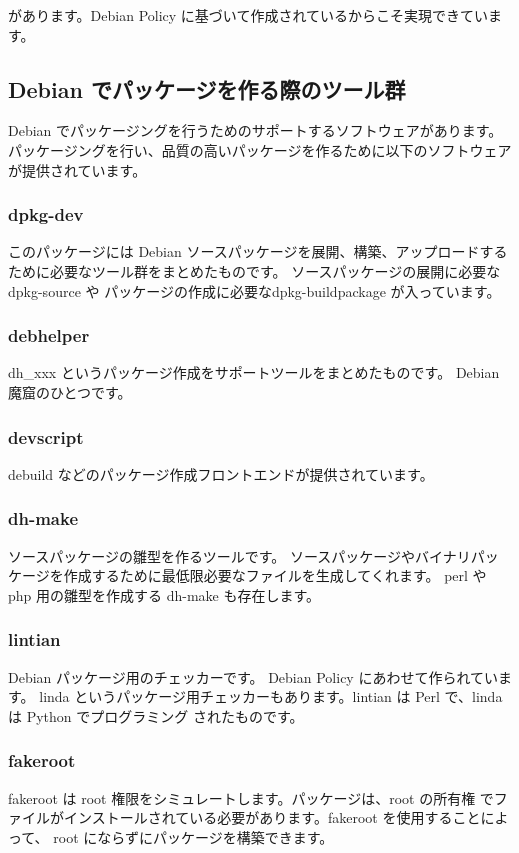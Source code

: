 \documentclass[mingoth,a4paper]{jsarticle}
\begin{document}
	があります。Debian Policy に基づいて作成されているからこそ実現できています。

\subsection{Debian でパッケージを作る際のツール群}

	Debian でパッケージングを行うためのサポートするソフトウェアがあります。
	パッケージングを行い、品質の高いパッケージを作るために以下のソフトウェア
	が提供されています。

\subsubsection{dpkg-dev}
	このパッケージには Debian ソースパッケージを展開、構築、アップロードするために必要なツール群をまとめたものです。
	ソースパッケージの展開に必要な dpkg-source や パッケージの作成に必要なdpkg-buildpackage が入っています。
  
\subsubsection{debhelper}

	dh\_xxx というパッケージ作成をサポートツールをまとめたものです。
	Debian 魔窟のひとつです。

\subsubsection{devscript}

	debuild などのパッケージ作成フロントエンドが提供されています。
	
\subsubsection{dh-make}
	ソースパッケージの雛型を作るツールです。
	ソースパッケージやバイナリパッケージを作成するために最低限必要なファイルを生成してくれます。
	perl や php 用の雛型を作成する dh-make も存在します。

	
\subsubsection{lintian}	
	Debian パッケージ用のチェッカーです。
	Debian Policy にあわせて作られています。
	linda というパッケージ用チェッカーもあります。lintian は Perl で、linda は Python でプログラミング
	されたものです。

\subsubsection{fakeroot}
	fakeroot は root 権限をシミュレートします。パッケージは、root の所有権
	でファイルがインストールされている必要があります。fakeroot を使用することによって、
	root にならずにパッケージを構築できます。  
\end{document}
